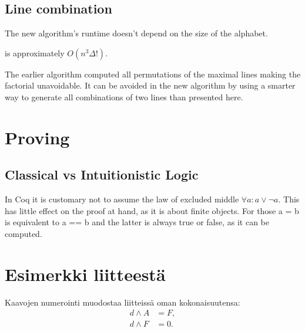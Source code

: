 \documentclass[english, 12pt, a4paper, sci, utf8, a-1b, online]{aaltothesis}
\begin{document}
\subsection{Line combination}

The new algorithm's runtime doesn't depend on the size of the alphabet.

is approximately $O(n^{3}\Delta!)$.

The earlier algorithm computed all permutations of the maximal lines making the factorial unavoidable. It can be avoided in the new algorithm by using a smarter way to generate all combinations of two lines than presented here. 


\section{Proving}

\subsection{Classical vs Intuitionistic Logic}

In Coq it is customary not to assume the law of excluded middle $\forall a : a \lor \lnot a$. This has little effect on the proof at hand, as it is about finite objects. For those a = b is equivalent to a == b and the latter is always true or false, as it can be computed.

\clearpage
\thesisbibliography{}




\clearpage
\thesisappendix{}

\section{Esimerkki liitteestä\label{LiiteA}}

Kaavojen numerointi muodostaa liitteissä oman kokonaisuutensa:
\begin{align}
d \wedge A &= F, \label{liitekaava1}\\
d \wedge F &= 0. \label{liitekaava2}
\end{align}
\end{document}
